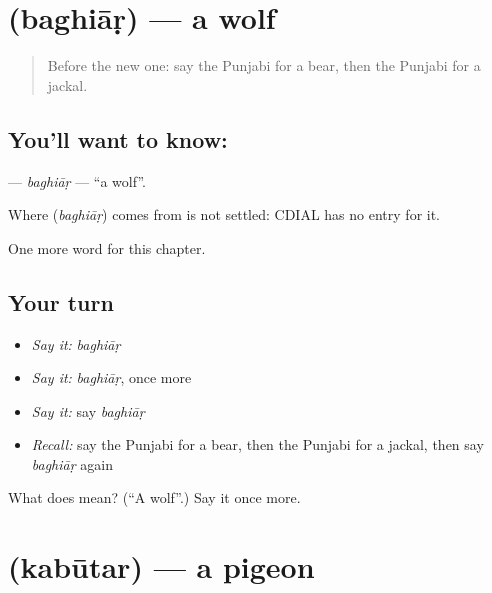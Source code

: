 \section[\texorpdfstring{\pa{ਬਘਿਆੜ} (baghiāṛ)}{ਬਘਿਆੜ (baghiāṛ)}]{ (baghiāṛ) — a wolf}

\label{lesson:PA-C130-baghiar}



\begin{quote}
Before the new one: say the Punjabi for a bear, then the Punjabi for a jackal.
\end{quote}

\subsection*{You'll want to know: }
\textbf{} — \emph{baghiāṛ} — \textquotedblleft{}a wolf\textquotedblright{}.

\begin{cousinweb}
Where \textbf{} (\emph{baghiāṛ}) comes from is not settled: CDIAL has no entry for it.
\end{cousinweb}

\begin{grammarlens}[title={What you've built}]
One more word for this chapter.
\end{grammarlens}

\subsection*{Your turn}
\begin{itemize}
\raggedright
  \item \emph{Say it:} \emph{baghiāṛ}
  \item \emph{Say it:} \emph{baghiāṛ}, once more
  \item \emph{Say it:} say \emph{baghiāṛ}
  \item \emph{Recall:} say the Punjabi for a bear, then the Punjabi for a jackal, then say \emph{baghiāṛ} again
\end{itemize}

\begin{tcolorbox}[breakable,colback=teal!4,colframe=teal!35!black,title={Before you move on}]
What does  mean? (\textquotedblleft{}A wolf\textquotedblright{}.) Say it once more.
\end{tcolorbox}
\section[\texorpdfstring{\pa{ਕਬੂਤਰ} (kabūtar)}{ਕਬੂਤਰ (kabūtar)}]{ (kabūtar) — a pigeon}

